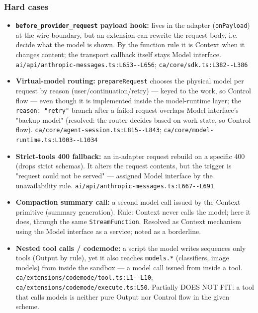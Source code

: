 \subsubsection*{Hard cases}
\begin{itemize}
\item \textbf{\texttt{before\_\allowbreak{}provider\_\allowbreak{}request} payload hook:} lives in the adapter (\texttt{onPayload}) at the wire boundary, but an extension can rewrite the request body, i.e. decide what the model is shown. By the function rule it is Context when it changes content; the transport callback itself stays Model interface. \texttt{ai/\allowbreak{}api/\allowbreak{}anthropic-\allowbreak{}messages.\allowbreak{}ts:\allowbreak{}L653-\allowbreak{}-\allowbreak{}L656}; \texttt{ca/\allowbreak{}core/\allowbreak{}sdk.\allowbreak{}ts:\allowbreak{}L382-\allowbreak{}-\allowbreak{}L386}
\item \textbf{Virtual-model routing:} \texttt{prepareRequest} chooses the physical model per request by reason (user/continuation/retry) --- keyed to the work, so Control flow --- even though it is implemented inside the model-runtime layer; the \texttt{reason:\allowbreak{} "retry"} branch after a failed request overlaps Model interface's "backup model" (resolved: the router decides based on work state, so Control flow). \texttt{ca/\allowbreak{}core/\allowbreak{}agent-\allowbreak{}session.\allowbreak{}ts:\allowbreak{}L815-\allowbreak{}-\allowbreak{}L843}; \texttt{ca/\allowbreak{}core/\allowbreak{}model-\allowbreak{}runtime.\allowbreak{}ts:\allowbreak{}L1003-\allowbreak{}-\allowbreak{}L1034}
\item \textbf{Strict-tools 400 fallback:} an in-adapter request rebuild on a specific 400 (drops strict schemas). It alters the request contents, but the trigger is "request could not be served" --- assigned Model interface by the unavailability rule. \texttt{ai/\allowbreak{}api/\allowbreak{}anthropic-\allowbreak{}messages.\allowbreak{}ts:\allowbreak{}L667-\allowbreak{}-\allowbreak{}L691}
\item \textbf{Compaction summary call:} a second model call issued by the Context primitive (summary generation). Rule: Context never calls the model; here it does, through the same \texttt{StreamFunction}. Resolved as Context mechanism using the Model interface as a service; noted as a borderline.
\item \textbf{Nested tool calls / codemode:} a script the model writes sequences only tools (Output by rule), yet it also reaches \texttt{models.\allowbreak{}*} (classifiers, image models) from inside the sandbox --- a model call issued from inside a tool. \texttt{ca/\allowbreak{}extensions/\allowbreak{}codemode/\allowbreak{}tool.\allowbreak{}ts:\allowbreak{}L1-\allowbreak{}-\allowbreak{}L10}; \texttt{ca/\allowbreak{}extensions/\allowbreak{}codemode/\allowbreak{}execute.\allowbreak{}ts:\allowbreak{}L50}. Partially DOES NOT FIT: a tool that calls models is neither pure Output nor Control flow in the given scheme.

\end{itemize}
